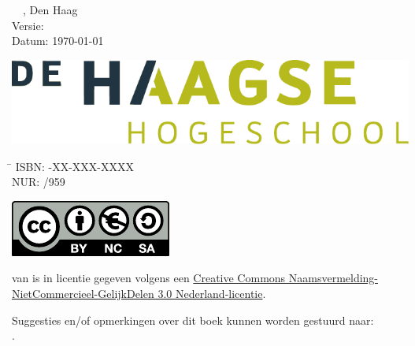 

\maketitle

\hspace*{0em}
\vfill
\textcopyright\the\year\ \ \bookauthor, Den Haag\\
Versie: \bookversion\\
Datum: \today

\vspace*{.25cm}
\ifusebookasbook\else
\includegraphics[scale=0.5]{images/HHS_grijs_groen_fc}
\fi

\ifusebookasbook
\vspace*{1cm}
\begin{tabbing}
\hspace{1.2cm}\=\kill
 ISBN: -XX-XXX-XXXX \\ 
 NUR:  /959
\end{tabbing}
\fi

\vspace*{2cm}
\includegraphics{images/by-nc-sa_eu.pdf}
\par
{\small%
\booktitle{} van \bookauthor{} is in licentie gegeven volgens
een \href{http://creativecommons.org/licenses/by-nc-sa/3.0/nl/}{Creative Commons
Naamsvermelding-NietCommercieel-GelijkDelen 3.0 Nederland-licentie}.

Suggesties en/of opmerkingen over dit boek kunnen worden gestuurd naar:\\
\href{mailto:\email}{\email}.}